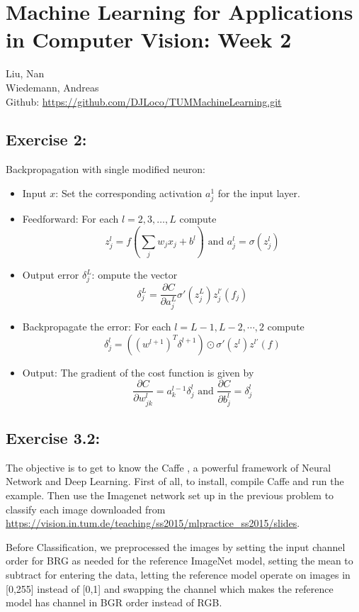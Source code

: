 \documentclass[12pt,a4paper,twoside]{article}
\begin{document}
\section*{Machine Learning for Applications \\
in Computer Vision: Week 2}
\hrulefill

Liu, Nan \\
Wiedemann, Andreas\\

Github: \url{https://github.com/DJLoco/TUMMachineLearning.git}\\


\hrulefill


\subsection*{Exercise 2:}
Backpropagation with single modified neuron:
\begin{itemize}
\item Input $x$: Set the corresponding activation $a_{j}^{1}$ for the input layer.
\item Feedforward: For each $l = 2,3,\ldots,L$ compute
\[z_{j}^{l} = f\left(\sum_{j} w_{j} x_{j}+b^{l}\right) \text{ and } a_{j}^{l} = \sigma(z_{j}^{l})\]
\item Output error $\delta_{j}^{L}$: ompute the vector
\[ \delta_{j}^{L} = \frac{\partial C}{\partial a_{j}^{L}} \sigma'(z_{j}^{L}) z_{j}^{l'} (f_{j})
\]
\item Backpropagate the error: For each $l = L-1, L-2, \cdots , 2$ compute
  \[ \delta_{j}^{l} = ((w^{l+1})^{T}\delta^{l+1}) \odot \sigma'(z^{l})z^{l'}(f)\]
\item Output: The gradient of the cost function is given by
\[\frac{\partial C}{\partial w_{jk}^{l}} = a_{k}^{l-1}\delta_{j}^{l} \text{ and }\frac{\partial C}{\partial b_{j}^{l}}= \delta_{j}^{l}\]
\end{itemize}

\subsection*{Exercise 3.2:}
The objective is to get to know the Caffe , a powerful framework of Neural Network and Deep Learning. First of all, to install, compile Caffe and run the example. Then use the Imagenet network  set up in the previous problem to classify each image downloaded from \url{https://vision.in.tum.de/teaching/ss2015/mlpractice_ss2015/slides}.

Before Classification, we preprocessed the images by setting the input channel order for BRG as needed for the reference ImageNet model, setting the mean to subtract for entering the data, letting the reference model operate on images in [0,255] instead of [0,1] and swapping the channel which makes the reference model has channel in BGR order instead of RGB.  
\end{document}
